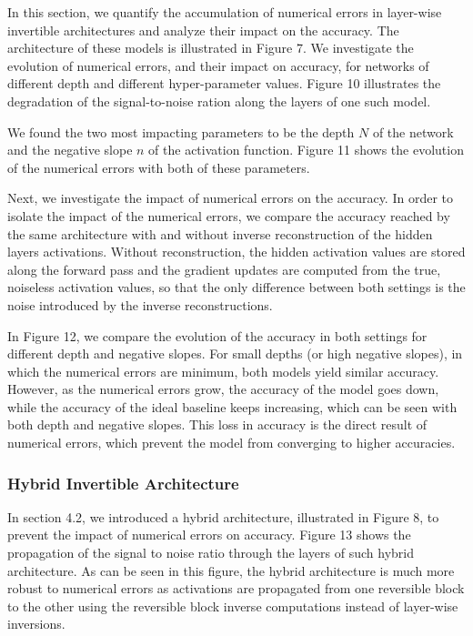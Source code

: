 \documentclass[twocolumn]{bmcart}
\begin{document}
In this section, we quantify the accumulation of numerical errors in layer-wise invertible architectures and analyze their impact on the accuracy.
The architecture of these models is illustrated in Figure 7.
We investigate the evolution of numerical errors, and their impact on accuracy, for networks of different depth and different hyper-parameter values.
Figure 10 illustrates the degradation of the signal-to-noise ration along the layers of one such model.

We found the two most impacting parameters to be the depth $N$ of the network and the negative slope $n$ of the activation function.
Figure 11 shows the evolution of the numerical errors with both of these parameters.

Next, we investigate the impact of numerical errors on the accuracy.
In order to isolate the impact of the numerical errors, 
we compare the accuracy reached by the same architecture with and without inverse reconstruction of the hidden layers activations.
Without reconstruction, the hidden activation values are stored along the forward pass and the gradient updates are computed from the true, 
noiseless activation values, so that the only difference between both settings is the noise introduced by the inverse reconstructions.

In Figure 12, we compare the evolution of the accuracy in both settings for different depth and negative slopes.
For small depths (or high negative slopes), in which the numerical errors are minimum, both models yield similar accuracy.
However, as the numerical errors grow, the accuracy of the model goes down, 
while the accuracy of the ideal baseline keeps increasing,
which can be seen with both depth and negative slopes.
This loss in accuracy is the direct result of numerical errors, 
which prevent the model from converging to higher accuracies.

\subsubsection{Hybrid Invertible Architecture}

In section 4.2, we introduced a hybrid architecture,
illustrated in Figure 8, to prevent the impact of numerical errors on accuracy.
Figure 13 shows the propagation of the signal to noise ratio through the layers of such hybrid architecture.
As can be seen in this figure, the hybrid architecture is much more robust to numerical errors as activations 
are propagated from one reversible block to the other using the reversible block inverse computations instead of layer-wise inversions.
\end{document}
